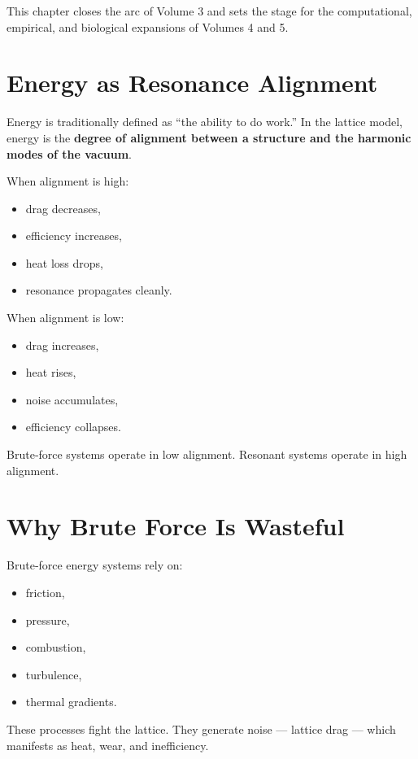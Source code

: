 \documentclass[11pt, letterpaper, openany]{book}
\begin{document}
This chapter closes the arc of Volume 3 and sets the stage for the computational,
empirical, and biological expansions of Volumes 4 and 5.

\section{Energy as Resonance Alignment}

Energy is traditionally defined as “the ability to do work.” In the lattice model, energy is
the \textbf{degree of alignment between a structure and the harmonic modes of the vacuum}.

When alignment is high:

\begin{itemize}
    \item drag decreases,
    \item efficiency increases,
    \item heat loss drops,
    \item resonance propagates cleanly.
\end{itemize}

When alignment is low:

\begin{itemize}
    \item drag increases,
    \item heat rises,
    \item noise accumulates,
    \item efficiency collapses.
\end{itemize}

Brute‑force systems operate in low alignment.  
Resonant systems operate in high alignment.

\section{Why Brute Force Is Wasteful}

Brute‑force energy systems rely on:

\begin{itemize}
    \item friction,
    \item pressure,
    \item combustion,
    \item turbulence,
    \item thermal gradients.
\end{itemize}

These processes fight the lattice. They generate noise — lattice drag — which manifests as
heat, wear, and inefficiency.
\end{document}
